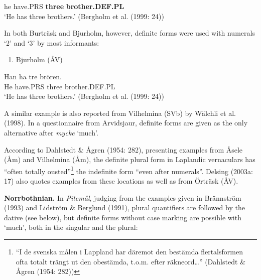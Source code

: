 he  have.PRS  \textbf{three} \textbf{brother.DEF.PL}\\ %


‘He has three brothers.’ (Bergholm et al. (1999: 24))
\z

In both Burträsk and Bjurholm, however, definite forms were used with numerals ‘2’ and ‘3’ by most informants:

\begin{enumerate} %
\item 
Bjurholm (ÅV)

\end{enumerate} %
Han  ha  tre  brören.\\


He  have.PRS  three  brother.DEF.PL\\ %


‘He has three brothers.’ (Bergholm et al. (1999: 24))
\z

A similar example is also reported from Vilhelmina (SVb) by Wälchli et al. (1998). In a questionnaire from Arvidsjaur, definite forms are given as the only alternative after \textit{mycke} ‘much’. 

According to Dahlstedt \& Ågren (1954: 282), presenting examples from Åsele (Åm) and Vilhelmina (Åm), the definite plural form in Laplandic vernaculars has “often totally ousted”\footnote{ “I de svenska målen i Lappland har däremot den bestämda flertalsformen ofta totalt trängt ut den obestämda, t.o.m. efter räkneord…” (Dahlstedt \& Ågren (1954: 282))} the indefinite form “even after numerals”.  Delsing (2003a: 17) also quotes examples from these locations as well as from Örträsk (ÅV). 

\textbf{Norrbothnian.} In \textit{Pitemål}, judging from the examples given in Brännström (1993) and Lidström \& Berglund (1991), plural quantifiers are followed by the dative (see below), but definite forms without case marking are possible with  ‘much’, both in the singular and the plural:

